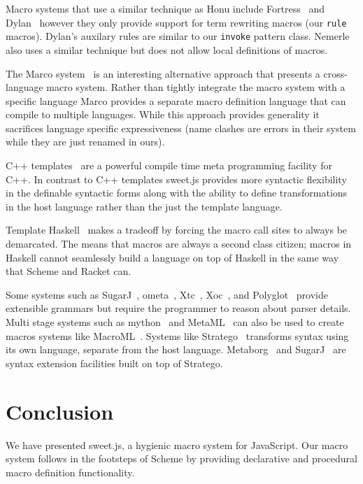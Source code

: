 \documentclass[preprint,10pt]{sigplanconf}
\begin{document}
Macro systems that use a similar technique as Honu include 
Fortress~\cite{Allen2009} and
Dylan~\cite{Bachrach1999} however they only provide support for term rewriting macros (our \verb!rule! macros).
Dylan's auxilary rules are similar to our \verb!invoke! pattern class.
Nemerle~\cite{Skalski2004} also uses a similar technique but does not allow local definitions of macros.

The Marco system~\cite{Lee2012a} is an interesting alternative
approach that presents a cross-language macro system. Rather than
tightly integrate the macro system with a specific language Marco
provides a separate macro definition language that can compile to
multiple languages. While this approach provides generality it
sacrifices language specific expressiveness (\eg name clashes are
errors in their system while they are just renamed in ours).

C++ templates~\cite{Alexandrescu2001} are a powerful compile time meta programming facility for C++. In contrast to C++ templates sweet.js provides more syntactic flexibility in the definable syntactic forms along with the ability to define transformations in the host language rather than the just the template language.

Template Haskell~\cite{Sheard2002} makes a tradeoff by forcing the macro call sites to always be demarcated. The means that macros are always a second class citizen; macros in Haskell cannot seamlessly build a language on top of Haskell in the same way that Scheme and Racket can.

Some systems such as 
SugarJ~\cite{Erdweg2011},
ometa~\cite{Warth2007},
Xtc~\cite{Grimm2006},
Xoc~\cite{Cox2008}, and Polyglot~\cite{Nystrom2003} provide extensible grammars but require the programmer to reason about parser details.
Multi stage systems such as mython~\cite{Riehl2009} and MetaML~\cite{Taha1997,Martel1997} can also be used to create macros systems like MacroML~\cite{Ganz2001}.
Systems like
Stratego~\cite{Visser2004} transforms syntax using its own language, separate from the host language. Metaborg~\cite{Bravenboer2004} and SugarJ~\cite{Erdweg2011} are syntax extension facilities built on top of Stratego.

\section{Conclusion}

We have presented sweet.js, a hygienic macro system for JavaScript. Our macro system follows in the footsteps of Scheme by providing declarative and procedural macro definition functionality.
\end{document}
